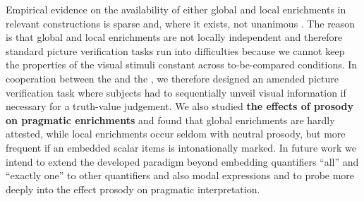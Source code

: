 \documentclass[fleqn,reqno,10pt]{article}
\begin{document}
\noindent Empirical evidence on the availability of either global and
local enrichments in relevant constructions is sparse and, where it
exists, not unanimous
\citep{GeurtsPouscoulous2009:Embedded-Implic,ChemlaSpector2010:Experimental-Ev}.
The reason is that global and local enrichments are not locally
independent and therefore standard picture verification tasks run into
difficulties because we cannot keep the properties of the visual
stimuli constant across to-be-compared conditions. In cooperation
between the  and the , we therefore designed an
amended picture verification task where subjects had to sequentially
unveil visual information if necessary for a truth-value judgement. We
also studied \textbf{the effects of prosody on pragmatic enrichments}
and found that global enrichments are hardly attested, while local
enrichments occur seldom with neutral prosody, but more frequent if an
embedded scalar items is intonationally marked. In future work we
intend to extend the developed paradigm beyond embedding quantifiers
``all'' and ``exactly one'' to other quantifiers and also modal
expressions and to probe more deeply into the effect prosody on
pragmatic interpretation.


\printbibliography[heading=bibintoc]
\end{document}

